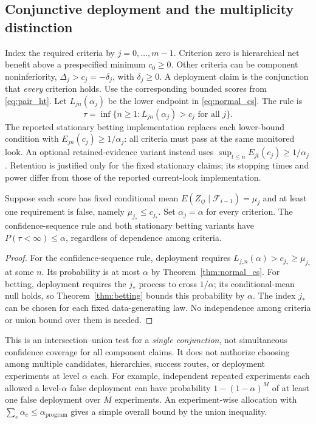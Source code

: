 \subsection{Conjunctive deployment and the multiplicity distinction}

Index the required criteria by $j=0,\ldots,m-1$. Criterion zero is
hierarchical net benefit above a prespecified minimum $c_0\geq0$.
Other criteria can be component noninferiority,
$\Delta_j>c_j=-\delta_j$, with $\delta_j\geq0$. A deployment claim is
the conjunction that \emph{every} criterion holds. Use the corresponding
bounded scores from \eqref{eq:pair_ht}. Let $L_{jn}(\alpha_j)$ be the
lower endpoint in \eqref{eq:normal_cs}. The rule is
\begin{equation}
 \tau=\inf\{n\geq1:L_{jn}(\alpha_j)>c_j
                     \text{ for all }j\}. \label{eq:deploy_rule}
\end{equation}
The reported stationary betting implementation replaces each lower-bound
condition with $E_{jn}(c_j)\geq1/\alpha_j$: all criteria must pass at the
same monitored look. An optional retained-evidence variant instead uses
$\sup_{t\leq n}E_{jt}(c_j)\geq1/\alpha_j$. Retention is justified only
for the fixed stationary claims; its stopping times and power differ
from those of the reported current-look implementation.

\begin{theorem}
\label{thm:iut}
Suppose each score has fixed conditional mean
$E(Z_{ij}\mid\mathcal F_{i-1})=\mu_j$ and at least one requirement is
false, namely $\mu_{j_*}\leq c_{j_*}$. Set $\alpha_j=\alpha$ for every
criterion. The confidence-sequence rule and both stationary betting variants have
$P(\tau<\infty)\leq\alpha$, regardless of dependence among criteria.
\end{theorem}
\begin{proof}
For the confidence-sequence rule, deployment requires
$L_{j_*n}(\alpha)>c_{j_*}\geq\mu_{j_*}$ at some $n$. Its probability
is at most $\alpha$ by Theorem~\ref{thm:normal_cs}.
For betting, deployment requires the $j_*$ process to cross
$1/\alpha$; its conditional-mean null holds, so
Theorem~\ref{thm:betting} bounds this probability by $\alpha$.
The index $j_*$ can be chosen for each fixed data-generating law. No
independence among criteria or union bound over them is needed.
\end{proof}

This is an intersection--union test for a \emph{single conjunction},
not simultaneous confidence coverage for all component claims. It does
not authorize choosing among multiple candidates, hierarchies, success
routes, or deployment experiments at level $\alpha$ each. For example,
independent repeated experiments each allowed a level-$\alpha$ false
deployment can have probability $1-(1-\alpha)^M$ of at least one false
deployment over $M$ experiments. An experiment-wise allocation with
$\sum_e\alpha_e\leq\alpha_{\mathrm{program}}$ gives a simple overall
bound by the union inequality.

